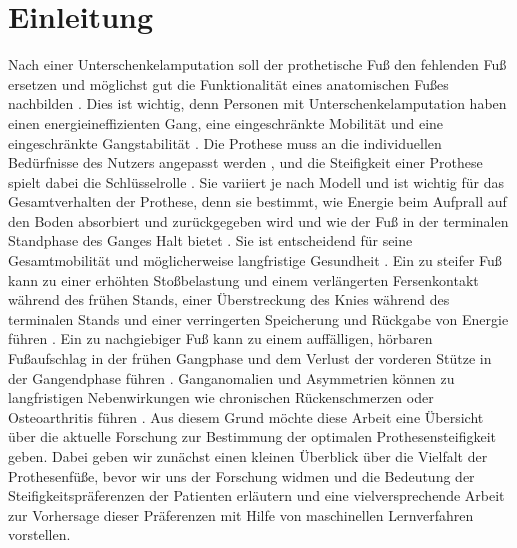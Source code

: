 \section{Einleitung}
Nach einer Unterschenkelamputation soll der prothetische Fuß den fehlenden Fuß ersetzen \cite{Louessard.2022} und möglichst gut die Funktionalität eines anatomischen Fußes nachbilden \cite{Stevens.2018}. Dies ist wichtig, denn Personen mit Unterschenkelamputation haben einen energieineffizienten Gang, eine eingeschränkte Mobilität und eine eingeschränkte Gangstabilität \cite{Vaca.2022}.
Die Prothese muss an die individuellen Bedürfnisse des Nutzers angepasst werden \cite{Stevens.2018}, und die Steifigkeit einer Prothese spielt dabei die Schlüsselrolle \cite{Shepherd.2020}. Sie variiert je nach Modell und ist wichtig für das Gesamtverhalten der Prothese, denn sie bestimmt, wie Energie beim Aufprall auf den Boden absorbiert und zurückgegeben wird und wie der Fuß in der terminalen Standphase des Ganges Halt bietet \cite{Shepherd.2020}. Sie ist entscheidend für seine Gesamtmobilität und möglicherweise langfristige Gesundheit \cite{Shepherd.2020}.
Ein zu steifer Fuß kann zu einer erhöhten Stoßbelastung und einem verlängerten Fersenkontakt während des frühen Stands, einer Überstreckung des Knies während des terminalen Stands und einer verringerten Speicherung und Rückgabe von Energie führen \cite{Shepherd.2020}. Ein zu nachgiebiger Fuß kann zu einem auffälligen, hörbaren Fußaufschlag in der frühen Gangphase und dem Verlust der vorderen Stütze in der Gangendphase führen \cite{Shepherd.2020}.
Ganganomalien und Asymmetrien können zu langfristigen Nebenwirkungen wie chronischen Rückenschmerzen oder Osteoarthritis führen \cite{Shepherd.2020}.
Aus diesem Grund möchte diese Arbeit eine Übersicht über die aktuelle Forschung zur Bestimmung der optimalen Prothesensteifigkeit geben. Dabei geben wir zunächst einen kleinen Überblick über die Vielfalt der Prothesenfüße, bevor wir uns der Forschung widmen und die Bedeutung der Steifigkeitspräferenzen der Patienten erläutern und eine vielversprechende Arbeit zur Vorhersage dieser Präferenzen mit Hilfe von maschinellen Lernverfahren vorstellen. 

